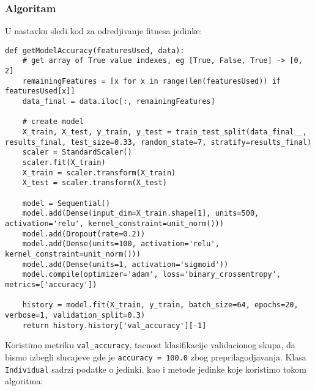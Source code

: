\documentclass[11pt]{article} %
\begin{document}
\subsubsection{Algoritam}
U nastavku sledi kod za odredjivanje fitnesa jedinke:

\begin{lstlisting}
def getModelAccuracy(featuresUsed, data):
    # get array of True value indexes, eg [True, False, True] -> [0, 2]
    remainingFeatures = [x for x in range(len(featuresUsed)) if featuresUsed[x]]
    data_final = data.iloc[:, remainingFeatures]
    
    # create model
    X_train, X_test, y_train, y_test = train_test_split(data_final__, results_final, test_size=0.33, random_state=7, stratify=results_final)
    scaler = StandardScaler()
    scaler.fit(X_train)
    X_train = scaler.transform(X_train)
    X_test = scaler.transform(X_test)
    
    model = Sequential()
    model.add(Dense(input_dim=X_train.shape[1], units=500, activation='relu', kernel_constraint=unit_norm()))
    model.add(Dropout(rate=0.2))
    model.add(Dense(units=100, activation='relu', kernel_constraint=unit_norm()))
    model.add(Dense(units=1, activation='sigmoid'))
    model.compile(optimizer='adam', loss='binary_crossentropy', metrics=['accuracy'])
    
    history = model.fit(X_train, y_train, batch_size=64, epochs=20, verbose=1, validation_split=0.3)
    return history.history['val_accuracy'][-1]
\end{lstlisting}

Koristimo metriku \lstinline{val_accuracy}, tacnost klasifikacije validacionog skupa, da bismo izbegli slucajeve gde je \lstinline{accuracy = 100.0} zbog preprilagodjavanja.\newline
Klasa \lstinline{Individual} sadrzi podatke o jedinki, kao i metode jedinke koje koristimo tokom algoritma:
\end{document}
